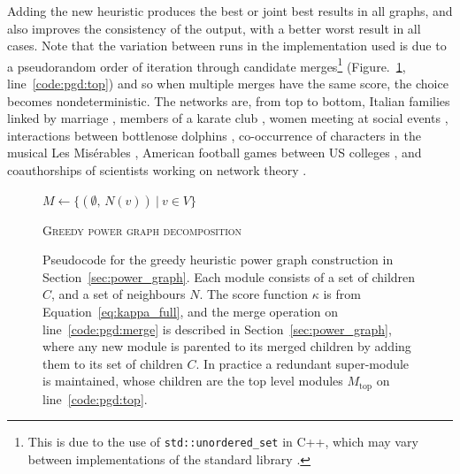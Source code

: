 Adding the new heuristic produces the best or joint best results in all graphs, and also improves the consistency of the output, with a better worst result in all cases.
Note that the variation between runs in the implementation used is due to a pseudorandom order of iteration through
candidate merges\footnote{This is due to the use of \texttt{std::unordered\_set} in C++, which may vary between implementations of the standard library \citep{Josuttis2012}.} (Figure.~\ref{fig:pseudo_pgd}, line~\ref{code:pgd:top}) and so when multiple merges have the same score, the choice becomes nondeterministic.
% 
The networks are, from top to bottom, Italian families linked by marriage \citep{Breiger1986}, members of a karate club \citep{Zachary1977}, women meeting at social events \citep{Davis2009}, interactions between bottlenose dolphins \citep{Lusseau2003}, co-occurrence of characters in the musical Les Mis\'erables \citep{Knuth1993}, American football games between US colleges \citep{Girvan2002}, and coauthorships of scientists working on network theory \citep{Newman2006Eigenvectors}.
 
\begin{figure}
  \removeAlgorithmFigureError
  \DontPrintSemicolon
  \begin{algorithm}[H]
    
    $M \leftarrow \{(\emptyset,\,N(v))\ |\ v\in V\}$
    
    \caption{\textsc{Greedy power graph decomposition}}
    \label{alg:pgd}
  \end{algorithm}
  
  \caption[Pseudocode for improved power graph decomposition]{Pseudocode for the greedy heuristic power graph construction in Section~\ref{sec:power_graph}.
  Each module consists of a set of children $C$, and a set of neighbours $N$.
  The score function $\kappa$ is from Equation~\eqref{eq:kappa_full}, and the merge operation on line~\ref{code:pgd:merge} is described in Section~\ref{sec:power_graph}, where any new module is parented to its merged children by adding them to its set of children $C$.
  In practice a redundant super-module is maintained, whose children are the top level modules $M_\mathrm{top}$ on line~\ref{code:pgd:top}.}
  \label{fig:pseudo_pgd}
\end{figure} 

